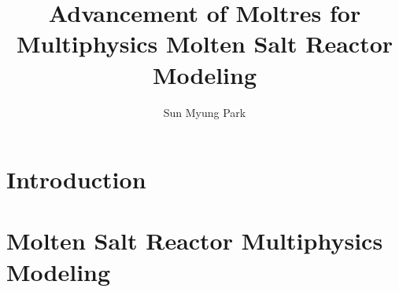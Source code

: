 \documentclass[edeposit,fullpage,12pt]{uiucthesis2021}
\title{Advancement of Moltres for Multiphysics Molten Salt Reactor Modeling}
\author{Sun Myung Park}
\begin{document}
\maketitle

\frontmatter
\begin{abstract}

%

\end{abstract}

\begin{dedication}

\end{dedication}

\begin{acknowledgments}

%

\end{acknowledgments}


{
  \hypersetup{linkcolor=black}
  \tableofcontents
}

\printglossary[title=List of Abbreviations,type=\acronymtype,nonumberlist,
nogroupskip=true]

\pagebreak
\mainmatter
\glsresetall

\chapter{Introduction}
\label{chap:intro}

\glsresetall

\chapter{Molten Salt Reactor Multiphysics Modeling}
\label{chap:lit}

\glsresetall
\end{document}
